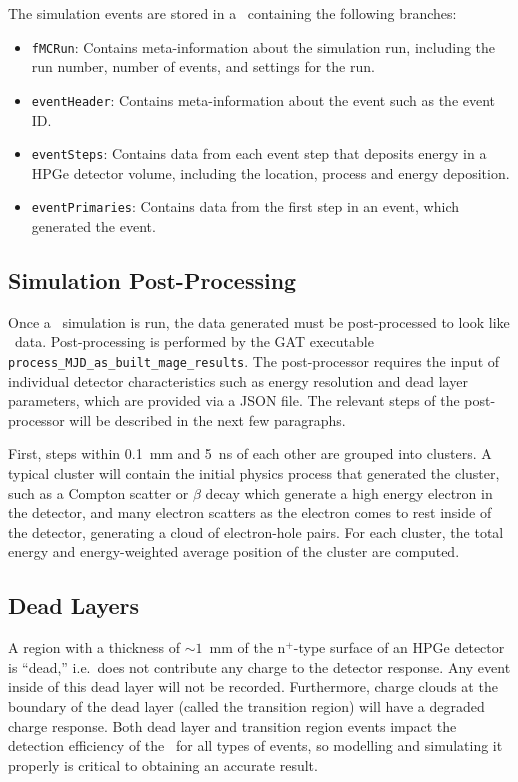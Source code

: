 \documentclass[/main.tex]{subfiles}
\begin{document}
The simulation events are stored in a \TTree\ containing the following branches:
\begin{itemize}
\item{\texttt{fMCRun}:}
  Contains meta-information about the simulation run, including the run number, number of events, and settings for the run.
\item{\texttt{eventHeader}:}
  Contains meta-information about the event such as the event ID.
\item{\texttt{eventSteps}:}
  Contains data from each event step that deposits energy in a HPGe detector volume, including the location, process and energy deposition.
\item{\texttt{eventPrimaries}:}
  Contains data from the first step in an event, which generated the event.
\end{itemize}

\subsection{Simulation Post-Processing} \label{sec:simpostproc}
Once a \Mage\ simulation is run, the data generated must be post-processed to look like \MJD\ data.
Post-processing is performed by the GAT executable \texttt{process\_MJD\_as\_built\_mage\_results}.
The post-processor requires the input of individual detector characteristics such as energy resolution and dead layer parameters, which are provided via a JSON file.
The relevant steps of the post-processor will be described in the next few paragraphs.

First, steps within 0.1~mm and 5~ns of each other are grouped into clusters.
A typical cluster will contain the initial physics process that generated the cluster, such as a Compton scatter or $\beta$ decay which generate a high energy electron in the detector, and many electron scatters as the electron comes to rest inside of the detector, generating a cloud of electron-hole pairs.
For each cluster, the total energy and energy-weighted average position of the cluster are computed.

\subsection{Dead Layers}\label{sec:deadlayers}
A region with a thickness of ${\sim}1$~mm of the n$^+$-type surface of an HPGe detector is ``dead,'' i.e.~does not contribute any charge to the detector response.
Any event inside of this dead layer will not be recorded.
Furthermore, charge clouds at the boundary of the dead layer (called the transition region) will have a degraded charge response.
Both dead layer and transition region events impact the detection efficiency of the \MJD\ for all types of events, so modelling and simulating it properly is critical to obtaining an accurate result.
\end{document}
